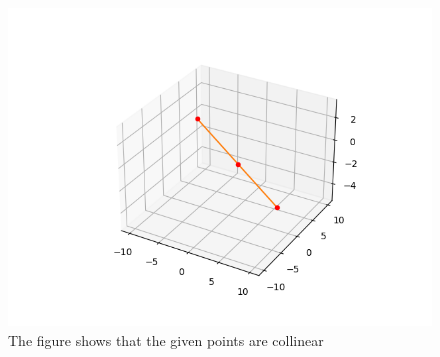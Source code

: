 \documentclass[A4,11pt,twocolumn]{IEEEtran}
\begin{document}
\begin{figure}[h!]
  \centering
   \includegraphics[width=\columnwidth]{figs/collinear_points.png}
    \caption{The figure shows that the given points are collinear}
     \label{fig:1}
     \end{figure}
\end{document}
